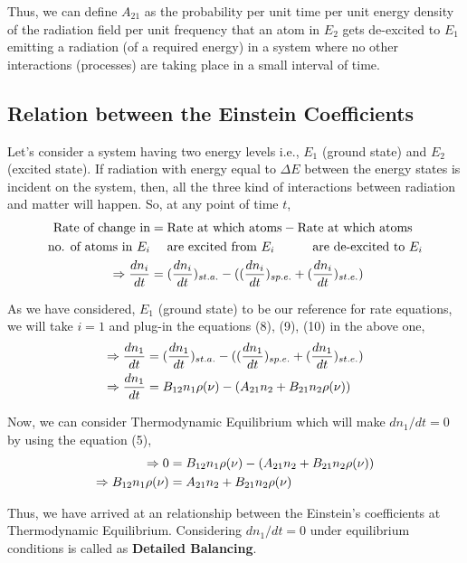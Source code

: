 \documentclass[12pt]{article}
\begin{document}
Thus, we can define $A_{21}$ as the probability per unit time per unit energy density of the radiation field per unit frequency that an atom in $E_{2}$ gets de-excited to $E_{1}$ emitting a radiation (of a required energy) in a system where no other interactions (processes) are taking place in a small interval of time.

\subsection{Relation between the Einstein Coefficients}

Let's consider a system having two energy levels i.e., $E_{1}$ (ground state) and $E_{2}$ (excited state). If radiation with energy equal to $\Delta E$ between the energy states is incident on the system, then, all the three kind of interactions between radiation and matter will happen. So, at any point of time $t$,
\begin{align}
    \text{Rate of change in} & = \text{Rate at which atoms} - \text{Rate at which atoms} \notag \\
    \text{no. of atoms in } E_{i} & \quad \text{ are excited from } E_{i} \quad \qquad \text{are de-excited to } E_{i} \notag \\
    \Rightarrow \frac{dn_{i}}{dt} & = (\frac{dn_{i}}{dt})_{st.a.} - ((\frac{dn_{i}}{dt})_{sp.e.} + (\frac{dn_{i}}{dt})_{st.e.}) \notag
\end{align}

As we have considered, $E_{1}$ (ground state) to be our reference for rate equations, we will take $i = 1$ and plug-in the equations (8), (9), (10) in the above one,
\begin{align}
    \Rightarrow \frac{dn_{1}}{dt} & = (\frac{dn_{1}}{dt})_{st.a.} - ((\frac{dn_{1}}{dt})_{sp.e.} + (\frac{dn_{1}}{dt})_{st.e.}) \notag \\
    \Rightarrow \frac{dn_{1}}{dt} & = B_{12}n_{1}\rho(\nu) - (A_{21}n_{2} + B_{21}n_{2}\rho(\nu))
\end{align}

Now, we can consider Thermodynamic Equilibrium which will make $dn_{1}/dt = 0$ by using the equation (5), 
\begin{align}
    \Rightarrow 0 & = B_{12}n_{1}\rho(\nu) - (A_{21}n_{2} + B_{21}n_{2}\rho(\nu)) \notag \\
    \Rightarrow B_{12}n_{1}\rho(\nu) & = A_{21}n_{2} + B_{21}n_{2}\rho(\nu)
\end{align}

Thus, we have arrived at an relationship between the Einstein's coefficients at Thermodynamic Equilibrium. Considering $dn_{1}/dt = 0$ under equilibrium conditions is called as \textbf{Detailed Balancing}. \vspace{.2cm}
\end{document}
